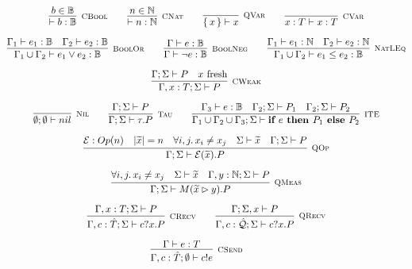 \begin{gather*}
\infer[\mbox{\footnotesize\scshape CBool}]{\vdash b : \mathbb{B}}{b \in \mathbb{B}} \qquad
\infer[\mbox{\footnotesize\scshape CNat}]{\vdash n : \mathbb{N}}{n \in \mathbb{N}} \qquad
\infer[\mbox{\footnotesize\scshape QVar}]{\set{x} \vdash x}{} \qquad
\infer[\mbox{\footnotesize\scshape CVar}]{x : T \vdash x : T}{} \\[0.2cm]
\infer[\mbox{\footnotesize\scshape BoolOr}]{\Gamma_1 \cup \Gamma_2 \vdash e_1 \lor e_2 : \mathbb{B}}{\Gamma_1 \vdash e_1 : \mathbb{B} & \Gamma_2 \vdash e_2 : \mathbb{B}} \qquad
\infer[\mbox{\footnotesize\scshape BoolNeg}]{\Gamma \vdash \neg e : \mathbb{B}}{\Gamma \vdash e : \mathbb{B}} \qquad
\infer[\mbox{\footnotesize\scshape NatLEq}]{\Gamma_1 \cup \Gamma_2 \vdash e_1 \leq e_2 : \mathbb{B}}{\Gamma_1 \vdash e_1 : \mathbb{N} & \Gamma_2 \vdash e_2 : \mathbb{N}} \\[0.2cm]
 \infer[\mbox{\footnotesize\scshape CWeak}]{\Gamma, x : T; \Sigma \vdash P}{\Gamma; \Sigma \vdash P & \text{$x$ fresh}} \\[0.2cm]
\infer[\mbox{\footnotesize\scshape Nil}]{\emptyset; \emptyset \vdash nil}{} \qquad
\infer[\mbox{\footnotesize\scshape Tau}]{\Gamma; \Sigma \vdash \tau . P}{ \Gamma; \Sigma \vdash P} \qquad
  \infer[\mbox{\footnotesize\scshape ITE}]{\Gamma_1 \cup \Gamma_2 \cup \Gamma_3; \Sigma \vdash \ite{e}{P_1}{P_2}}{\Gamma_3 \vdash e : \mathbb{B} & \Gamma_2; \Sigma \vdash P_1 & \Gamma_2; \Sigma \vdash P_2} \\[0.2cm]
\infer[\mbox{\footnotesize\scshape QOp}]
{\Gamma; \Sigma \vdash \mathcal{E}(\widetilde{x}) . P}
{\mathcal{E}: Op(n) & |\widetilde{x}| = n & \forall i, j \ldotp x_i \neq x_j & \Sigma \vdash \widetilde{x} & \Gamma; \Sigma \vdash P} \\[0.2cm]
\infer[\mbox{\footnotesize\scshape QMeas}]{\Gamma; \Sigma \vdash M(\widetilde{x} \rhd y) . P}
{\forall i, j \ldotp x_i \neq x_j & \Sigma \vdash \widetilde{x} & \Gamma, y : \mathbb{N}; \Sigma \vdash P} \\[0.2cm]
\infer[\mbox{\footnotesize\scshape CRecv}]
{\Gamma, c : \hat{T}; \Sigma \vdash c?x . P}
{\Gamma, x : T; \Sigma \vdash P} 
\qquad
\infer[\mbox{\footnotesize\scshape QRecv}]
{\Gamma, c : \hat{\mathcal{Q}}; \Sigma \vdash c?x . P}
{\Gamma; \Sigma, x \vdash P} 
\\[0.2cm]
\infer[\mbox{\footnotesize\scshape CSend}]{\Gamma, c : \hat{T}; \emptyset \vdash c!e}{\Gamma \vdash e : T} \qquad

\end{gather*}
